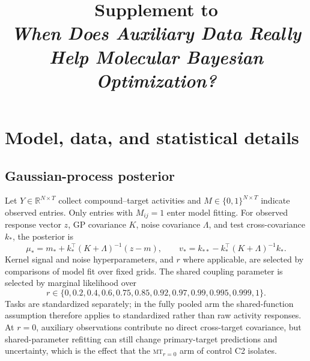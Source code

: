 \documentclass[10pt]{article}
\title{Supplement to\\
\emph{When Does Auxiliary Data Really Help Molecular Bayesian Optimization?}}
\author{}
\date{}
\newcommand{\mtzero}{\textsc{mt}$_{r=0}$}
\begin{document}
\maketitle

\tableofcontents
\bigskip

\section{Model, data, and statistical details}
\label{app:methods}

\subsection{Gaussian-process posterior}
\label{app:model-details}

Let $Y\in\mathbb R^{N\times T}$ collect compound--target activities and
$M\in\{0,1\}^{N\times T}$ indicate observed entries. Only entries with
$M_{ij}=1$ enter model fitting. For observed response vector $z$, GP
covariance $K$, noise covariance $\Lambda$, and test cross-covariance $k_*$,
the posterior is
\[
\mu_*=m_*+k_*^\top(K+\Lambda)^{-1}(z-m),\qquad
v_*=k_{**}-k_*^\top(K+\Lambda)^{-1}k_*.
\]
Kernel signal and noise hyperparameters, and $r$ where applicable, are
selected by comparisons of model fit over fixed grids. The shared coupling
parameter is selected by marginal likelihood over
\[
r\in\{0,0.2,0.4,0.6,0.75,0.85,0.92,0.97,0.99,0.995,0.999,1\}.
\] Tasks are standardized
separately; in the fully pooled arm the shared-function assumption therefore
applies to standardized rather than raw activity responses. At $r=0$,
auxiliary observations contribute no direct cross-target covariance, but
shared-parameter refitting can still change primary-target predictions and
uncertainty, which is the effect that the \mtzero{} arm of control C2
isolates.
\end{document}
